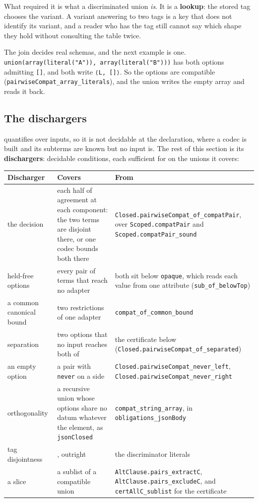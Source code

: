 What required it is what a discriminated union \emph{is}. It is a \textbf{lookup}: the stored tag chooses
the variant. A variant answering to two tags is a key that does not identify its variant, and a
reader who has the tag still cannot say which shape they hold without consulting the table twice.

The join decides real schemas, and the next example is one.
\texttt{union(array(literal("A")),\ array(literal("B")))} has both options admitting \texttt{{[}{]}}, and both write
\texttt{⟨L,\ {[}{]}⟩}. So the options are compatible (\texttt{pairwiseCompat\_array\_literals}), and the union writes
the empty array and reads it back.

\subsection{The dischargers}\label{the-dischargers}

 quantifies over inputs, so it is not decidable at the declaration, where a
codec is built and its subterms are known but no input is. The rest of this section is its
\textbf{dischargers}: decidable conditions, each sufficient for  on the
unions it covers:

\begin{tabular}{@{}lll@{}}
\toprule
Discharger & Covers & From \\
\midrule
the decision & each half of agreement at each component: the two terms are disjoint there, or one codec bounds both there & \texttt{Closed.pairwiseCompat\_of\_compatPair}, over \texttt{Scoped.compatPair} and \texttt{Scoped.compatPair\_sound} \\
held-free options & every pair of terms that reach no adapter & both sit below \texttt{opaque}, which reads each value from one attribute (\texttt{sub\_of\_belowTop}) \\
a common canonical bound & two restrictions of one adapter & \texttt{compat\_of\_common\_bound} \\
separation & two options that no input reaches both of & the certificate below (\texttt{Closed.pairwiseCompat\_of\_separated}) \\
an empty option & a pair with \texttt{never} on a side & \texttt{Closed.pairwiseCompat\_never\_left}, \texttt{Closed.pairwiseCompat\_never\_right} \\
orthogonality & a recursive union whose options share no datum whatever the element, as \texttt{jsonClosed} & \texttt{compat\_string\_array}, in \texttt{obligations\_jsonBody} \\
tag disjointness & {rule:dunion}{\texttt{(dunion)}}, outright & the discriminator literals \\
a slice & a sublist of a compatible union & \texttt{AltClause.pairs\_extractC}, \texttt{AltClause.pairs\_excludeC}, and \texttt{certAllC\_sublist} for the certificate \\
\bottomrule
\end{tabular}

